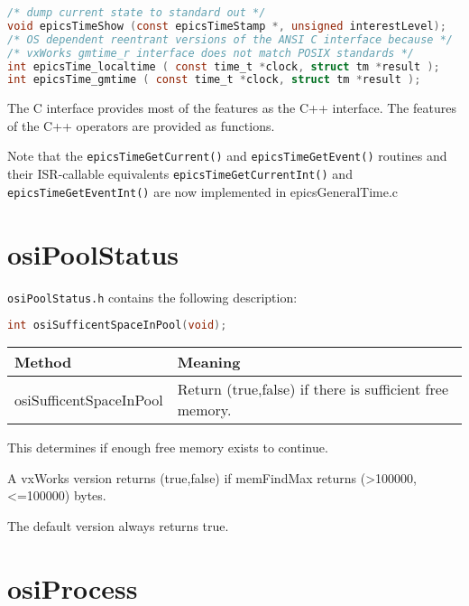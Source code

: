 \begin{lstlisting}[language=C]
/* dump current state to standard out */
void epicsTimeShow (const epicsTimeStamp *, unsigned interestLevel);
/* OS dependent reentrant versions of the ANSI C interface because */
/* vxWorks gmtime_r interface does not match POSIX standards */
int epicsTime_localtime ( const time_t *clock, struct tm *result );
int epicsTime_gmtime ( const time_t *clock, struct tm *result );

\end{lstlisting}

The C interface provides most of the features as the C++ interface.
The features of the C++ operators are provided as functions.

Note that the \verb|epicsTimeGetCurrent()| and \verb|epicsTimeGetEvent()| routines and their ISR-callable equivalents \verb|epicsTimeGetCurrentInt()| and \verb|epicsTimeGetEventInt()| are now implemented in epicsGeneralTime.c

\section{osiPoolStatus}

\verb|osiPoolStatus.h| contains the following description:

\begin{lstlisting}[language=C]
int osiSufficentSpaceInPool(void);
\end{lstlisting}

\begin{center}
\begin{longtable}{p{1.52778in}p{3.40278in}}
\textbf{Method} & \textbf{Meaning}\\
\hline
osiSufficentSpaceInPool & Return (true,false) if there is sufficient free memory.
\end{longtable}

\end{center}


This determines if enough free memory exists to continue.

A vxWorks version returns (true,false) if memFindMax returns (\textgreater{}100000, \textless{}=100000) bytes.

The default version always returns true.

\section{osiProcess}

